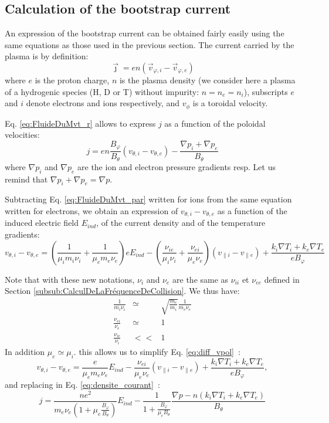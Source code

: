 		\subsection{Calculation of the bootstrap current}
		\label{sub:CalculDuCourantAutoGenere}

An expression of the bootstrap current can be obtained fairly easily using the same equations as those used in the previous section.
The current carried by the plasma is by definition:
\[
		\vec{\jmath} = en \left( \vec{v}_{\varphi,i} - \vec{v}_{\varphi,e} \right)
\]
where $e$ is the proton charge, $n$ is the plasma density (we consider here a plasma of a hydrogenic species (H, D or T) without impurity: $n = n_e = n_i$), subscripts $e$ and $i$ denote electrons and ions respectively, and $v_\phi$ is a toroidal velocity.

Eq. \ref{eq:FluideDuMvt_r} allows to express $j$ as a function of the poloidal velocities:
\begin{equation}
		j = en\frac{B_\varphi}{B_\theta} \left( v_{\theta,i} - v_{\theta,e} \right) - \frac{\nabla p_i + \nabla p_e}{B_\theta}
		\label{eq:densite_courant}
\end{equation}
where $\nabla p_i$ and $\nabla p_e$ are the ion and electron pressure gradients resp. Let us remind that $\nabla p_i + \nabla p_e = \nabla p$.

Subtracting Eq. \ref{eq:FluideDuMvt_par} written for ions from the same equation written for electrons, we obtain an expression of $v_{\theta,i} - v_{\theta,e}$ as a function of the induced electric field $E_{ind}$, of the current density and of the temperature gradients:
\begin{equation}
		v_{\theta,i} - v_{\theta,e} = \left( \frac{1}{\mu_i m_i \nu_i} + \frac{1}{\mu_e m_e \nu_e} \right) e E_{ind} - \left( \frac{\nu_{ie}}{\mu_i \nu_i} + \frac{\nu_{ei}}{\mu_e \nu_e} \right) \left( v_{\|i} - v_{\|e} \right) + \frac{k_i\nabla T_i + k_e\nabla T_e}{e B_\varphi}
		\label{eq:diff_vpol}
\end{equation}

Note that with these new notations, $\nu_i$ and $\nu_e$ are the same as $\nu_{ii}$ et $\nu_{ee}$ defined in Section \ref{subsub:CalculDeLaFréquenceDeCollision}. We thus have:
\begin{eqnarray*}
		\frac{1}{m_i \nu_i} & \simeq & \sqrt{\frac{m_e}{m_i}} \frac{1}{m_e\nu_e}		\\
		\frac{\nu_{ei}}{\nu_e}	&	\simeq	&	1					\\
		\frac{\nu_{ie}}{\nu_i} &	<<	&	1
\end{eqnarray*}
In addition $\mu_e \simeq \mu_i$. this allows us to simplify Eq. \ref{eq:diff_vpol}~:
\[
		v_{\theta,i} - v_{\theta,e} = \frac{e}{\mu_e m_e \nu_e}E_{ind} - \frac{\nu_{ei}}{\mu_e \nu_e} \left( v_{\|i} - v_{\|e} \right) + \frac{k_i\nabla T_i + k_e \nabla T_e}{e B_\varphi},
\]
and replacing in Eq. \ref{eq:densite_courant}~:
\[
		j = \frac{n e^2}{m_e\nu_e \left( 1 + \mu_e\frac{B_\varphi}{B_\theta} \right)} E_{ind} - \frac{1}{1 + \frac{B_\varphi}{\mu_e B_\theta}} \frac{\nabla p - n\left( k_i\nabla T_i + k_e\nabla T_e \right)}{B_\theta}
\]

